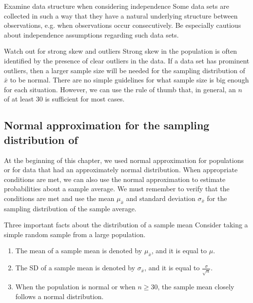 \begin{onebox}{Examine data structure when considering independence}
{Some data sets are collected in such a way that they have a natural underlying structure between observations, e.g. when observations occur consecutively. Be especially cautious about independence assumptions regarding such data sets.}
\end{onebox}

\begin{onebox}{Watch out for strong skew and outliers}
{Strong skew in the population is often identified by the presence of clear outliers in the data. If a data set has prominent outliers, then a larger sample size will be needed for the sampling distribution of $\bar{x}$ to be normal. There are no simple guidelines for what sample size is big enough for each situation. However, we can use the rule of thumb that, in general, an $n$ of at least 30 is sufficient for most cases.}
\end{onebox}



\subsection[Normal approximation for the sampling distribution of $\bar{x}$]{Normal approximation for the sampling distribution of }

At the beginning of this chapter, we used normal approximation for populations or for data that had an approximately normal distribution. When appropriate conditions are met, we can also use the normal approximation to estimate probabilities about a sample average. We must remember to verify that the conditions are met and use the mean $\mu_{\bar{x}}$ and standard deviation $\sigma_{\bar{x}}$ for the sampling distribution of the sample average.

\begin{onebox}{Three important facts about the distribution of a sample mean }
Consider taking a simple random sample from a large population.
\begin{enumerate}
\setlength{\itemsep}{0mm}
\item The mean of a sample mean is denoted by $\mu_{\bar{x}}$, and it is equal to $\mu$.
\item The SD of a sample mean is denoted by $\sigma_{\bar{x}}$, and it is equal to $\frac{\sigma}{\sqrt{n}}$.
\item When the population is normal or when $n\ge 30$, the sample mean closely follows a normal distribution. 
\end{enumerate}\end{onebox}

